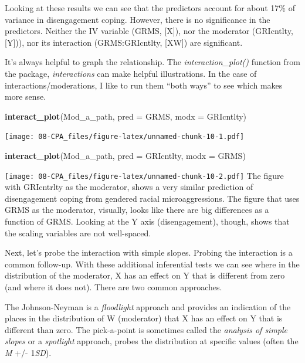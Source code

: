 \documentclass[
  11pt,
]{book}
\newenvironment{Shaded}{\begin{snugshade}}{\end{snugshade}}
\newcommand{\AttributeTok}[1]{\textcolor[rgb]{0.27,0.27,0.27}{#1}}
\newcommand{\FunctionTok}[1]{\textcolor[rgb]{0.27,0.27,0.27}{\textbf{#1}}}
\newcommand{\NormalTok}[1]{#1}
\begin{document}
Looking at these results we can see that the predictors account for about 17\% of variance in disengagement coping. However, there is no significance in the predictors. Neither the IV variable (GRMS, {[}X{]}), nor the moderator (GRIcntlty, {[}Y{]})), nor its interaction (GRMS:GRIcntlty, {[}XW{]}) are significant.

It's always helpful to graph the relationship. The \emph{interaction\_plot()} function from the package, \emph{interactions} can make helpful illustrations. In the case of interactions/moderations, I like to run them ``both ways'' to see which makes more sense.

\begin{Shaded}
\begin{Highlighting}[]
\FunctionTok{interact\_plot}\NormalTok{(Mod\_a\_path, }\AttributeTok{pred =}\NormalTok{ GRMS, }\AttributeTok{modx =}\NormalTok{ GRIcntlty)}
\end{Highlighting}
\end{Shaded}

\texttt{[image: 08-CPA\_files/figure-latex/unnamed-chunk-10-1.pdf]}

\begin{Shaded}
\begin{Highlighting}[]
\FunctionTok{interact\_plot}\NormalTok{(Mod\_a\_path, }\AttributeTok{pred =}\NormalTok{ GRIcntlty, }\AttributeTok{modx =}\NormalTok{ GRMS)}
\end{Highlighting}
\end{Shaded}

\texttt{[image: 08-CPA\_files/figure-latex/unnamed-chunk-10-2.pdf]} The figure with GRIcntrlty as the moderator, shows a very similar prediction of disengagement coping from gendered racial microaggressions. The figure that uses GRMS as the moderator, visually, looks like there are big differences as a function of GRMS. Looking at the Y axis (disengagement), though, shows that the scaling variables are not well-spaced.

Next, let's probe the interaction with simple slopes. Probing the interaction is a common follow-up. With these additional inferential tests we can see where in the distribution of the moderator, X has an effect on Y that is different from zero (and where it does not). There are two common approaches.

The Johnson-Neyman is a \emph{floodlight} approach and provides an indication of the places in the distribution of W (moderator) that X has an effect on Y that is different than zero. The pick-a-point is sometimes called the \emph{analysis of simple slopes} or a \emph{spotlight} approach, probes the distribution at specific values (often the \emph{M} +/- 1\emph{SD}).
\end{document}
